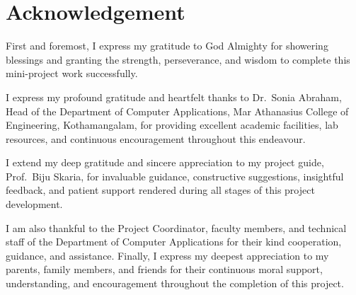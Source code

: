 \documentclass[12pt,a4paper]{report}
\renewcommand{\headrulewidth}{0.4pt}
\renewcommand{\footrulewidth}{0.4pt}
\renewcommand{\headrulewidth}{0.4pt}
\renewcommand{\footrulewidth}{0.4pt}
\begin{document}
\newpage
{}
\setcounter{page}{1}


\pagestyle{fancy}
\fancyhf{}
\fancyfoot[C]{\thepage}

\renewcommand{\headrulewidth}{0pt}
\renewcommand{\footrulewidth}{0pt}

\fancypagestyle{plain}{
    \fancyhf{}
    \fancyfoot[C]{\thepage}
    \renewcommand{\headrulewidth}{0pt}
    \renewcommand{\footrulewidth}{0pt}
}


\chapter*{Acknowledgement}
{}

First and foremost, I express my gratitude to God Almighty for showering blessings and granting
the strength, perseverance, and wisdom to complete this mini-project work successfully.

I express my profound gratitude and heartfelt thanks to Dr.~Sonia Abraham, Head
of the Department of Computer Applications, Mar Athanasius College of Engineering,
Kothamangalam, for providing excellent academic facilities, lab resources, and continuous
encouragement throughout this endeavour.

I extend my deep gratitude and sincere appreciation to my project guide, Prof.~Biju Skaria, for
invaluable guidance, constructive suggestions, insightful feedback, and patient support rendered
during all stages of this project development.

I am also thankful to the Project Coordinator, faculty members, and technical staff of the
Department of Computer Applications for their kind cooperation, guidance, and assistance.
Finally, I express my deepest appreciation to my parents, family members, and friends for their
continuous moral support, understanding, and encouragement throughout the completion of this
project.


\vspace{1.5cm}

\begin{flushright}
\\
\\
\end{flushright}
\end{document}
